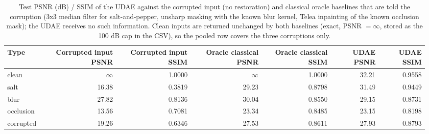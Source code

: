 \begin{table}[t]
\centering
\caption{Test PSNR (dB) / SSIM of the UDAE against the corrupted input (no restoration) and classical oracle baselines that are told the corruption (3x3 median filter for salt-and-pepper, unsharp masking with the known blur kernel, Telea inpainting of the known occlusion mask); the UDAE receives no such information. Clean inputs are returned unchanged by both baselines (exact, PSNR $=\infty$, stored as the 100 dB cap in the CSV), so the pooled row covers the three corruptions only.}
\label{tab:task1_comparison_by_type}
\begin{tabular}{lrrrrrr}
\toprule
Type & Corrupted input PSNR & Corrupted input SSIM & Oracle classical PSNR & Oracle classical SSIM & UDAE PSNR & UDAE SSIM \\
\midrule
clean & $\infty$ & 1.0000 & $\infty$ & 1.0000 & 32.21 & 0.9558 \\
salt & 16.38 & 0.3819 & 29.23 & 0.8798 & 31.49 & 0.9449 \\
blur & 27.82 & 0.8136 & 30.04 & 0.8550 & 29.15 & 0.8731 \\
occlusion & 13.56 & 0.7081 & 23.34 & 0.8485 & 23.15 & 0.8198 \\
corrupted & 19.26 & 0.6346 & 27.53 & 0.8611 & 27.93 & 0.8793 \\
\bottomrule
\end{tabular}
\end{table}
